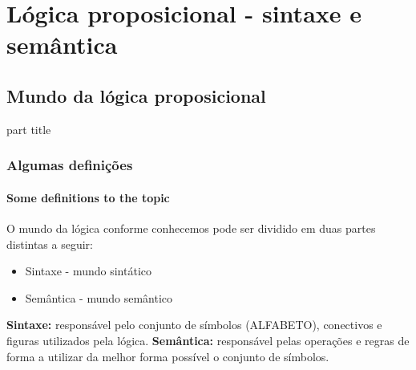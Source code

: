 \section{Lógica proposicional - sintaxe e semântica}
%
\subsection{Mundo da lógica proposicional}
%
\begin{frame}[c]
    \begin{beamercolorbox}[rounded=true,shadow=true,sep=12pt,center]{part title}
        \insertsection\par
    \end{beamercolorbox}
\end{frame}
%
\begin{frame}[t]
    \frametitle{Algumas definições}
    \framesubtitle{Some definitions to the topic}
    \begin{tcolorbox}[colback=blue!5,colframe=blue!60!black,adjusted title=Mundo lógico]
        O mundo da lógica conforme conhecemos pode ser dividido em duas partes distintas a seguir:
        \begin{itemize}
            \item Sintaxe - mundo sintático
            \item Semântica - mundo semântico
        \end{itemize}
    \end{tcolorbox}
    \begin{tcolorbox}[colback=red!5!white,colframe=red!75!black,title=Descritivo]
        \textbf{Sintaxe:} responsável pelo conjunto de símbolos (ALFABETO), conectivos e figuras utilizados pela lógica.
        \tcblower
        \textbf{Semântica:} responsável pelas operações e regras de forma a utilizar da melhor forma possível o conjunto de símbolos.
    \end{tcolorbox}
\end{frame}
%
